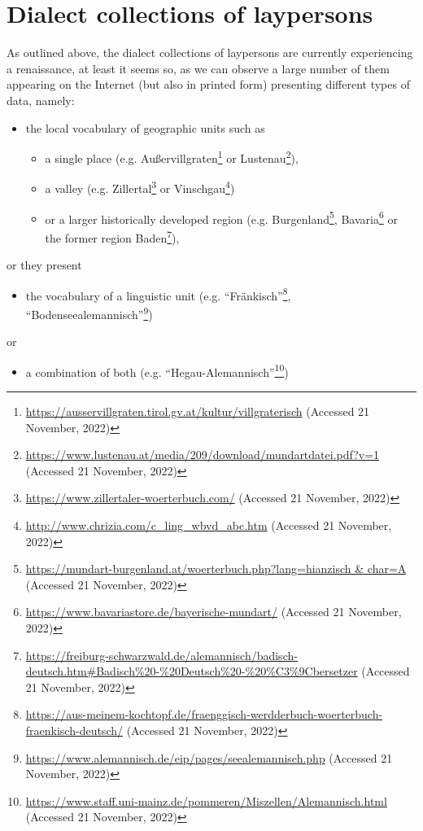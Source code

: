 \documentclass[output=paper]{langscibook}
\begin{document}
\section{Dialect collections of laypersons}
\label{sec:kathrein:2}
As outlined above, the dialect collections of laypersons are currently experiencing a renaissance, at least it seems so, as we can observe a large number of them appearing on the Internet (but also in printed form) presenting different types of data, namely: 

\begin{itemize}
\item the local vocabulary of {geographic units} such as 
\begin{itemize}
\item a single {place} (e.g. Außervillgraten\footnote{\url{https://ausservillgraten.tirol.gv.at/kultur/villgraterisch} (Accessed 21 November, 2022)} or Lustenau\footnote{\url{https://www.lustenau.at/media/209/download/mundartdatei.pdf?v=1} (Accessed 21 November, 2022)}), 
\item a {valley} (e.g. Zillertal\footnote{\url{https://www.zillertaler-woerterbuch.com/} (Accessed 21 November, 2022)} or Vinschgau\footnote{\url{http://www.chrizia.com/c_ling_wbvd_abc.htm} (Accessed 21 November, 2022)}) 
\item or a larger historically developed {region} (e.g. Burgenland\footnote{\url{https://mundart-burgenland.at/woerterbuch.php?lang=hianzisch & char=A} (Accessed 21 November, 2022)}, Bavaria\footnote{\url{https://www.bavariastore.de/bayerische-mundart/} (Accessed 21 November, 2022)} or the former region Baden\footnote{\url{https://freiburg-schwarzwald.de/alemannisch/badisch-deutsch.htm\#Badisch\%20-\%20Deutsch\%20-\%20\%C3\%9Cbersetzer} (Accessed 21 November, 2022)}), 
\end{itemize}
\end{itemize}

or they present 
\begin{itemize}
\item the vocabulary of a {linguistic} {unit} (e.g. “Fränkisch”\footnote{\url{https://aus-meinem-kochtopf.de/fraenggisch-werdderbuch-woerterbuch-fraenkisch-deutsch/} (Accessed 21 November, 2022)}, “Bodenseealemannisch”\footnote{\url{https://www.alemannisch.de/eip/pages/seealemannisch.php} (Accessed 21 November, 2022)}) 
\end{itemize}

or
\begin{itemize}
\item a {combination} of both (e.g. “Hegau-Alemannisch”\footnote{\url{https://www.staff.uni-mainz.de/pommeren/Miszellen/Alemannisch.html} (Accessed 21 November, 2022)}) 
\end{itemize}
\end{document}
